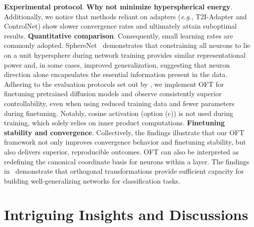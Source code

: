 \textbf{Experimental protocol}. \textbf{Why not minimize hyperspherical energy}. Additionally, we notice that methods reliant on adapters (\emph{e.g.}, T2I-Adapter and ControlNet) show slower convergence rates and ultimately attain suboptimal results. \textbf{Quantitative comparison}. Consequently, small learning rates are commonly adopted. SphereNet~\cite{liu2017deep} demonstrates that constraining all neurons to lie on a unit hypersphere during network training provides similar representational power and, in some cases, improved generalization, suggesting that neuron direction alone encapsulates the essential information present in the data. Adhering to the evaluation protocols set out by \cite{zhang2023adding,mou2023t2i}, we implement OFT for finetuning pretrained diffusion models and observe consistently superior controllability, even when using reduced training data and fewer parameters during finetuning. Notably, cosine activation (option (c)) is not used during training, which solely relies on inner product computations. \textbf{Finetuning stability and convergence}. Collectively, the findings illustrate that our OFT framework not only improves convergence behavior and finetuning stability, but also delivers superior, reproducible outcomes. OFT can also be interpreted as redefining the canonical coordinate basis for neurons within a layer. The findings in~\cite{liu2021orthogonal} demonstrate that orthogonal transformations provide sufficient capacity for building well-generalizing networks for classification tasks. \section{Intriguing Insights and Discussions}

